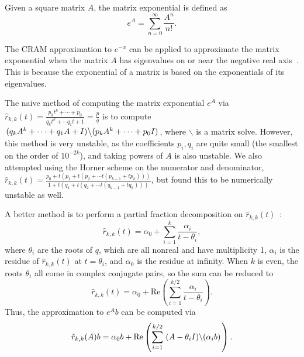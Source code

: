 Given a square matrix $A$, the matrix exponential is defined
as~\cite{ationneeded}
\begin{equation}
  \label{eq:matrix-exponential}
  e^{A} = \sum_{n=0}^\infty \frac{A^n}{n!}.
\end{equation}

The CRAM approximation to $e^{-x}$ can be applied to approximate the matrix
exponential when the matrix $A$ has eigenvalues on or near the negative real
axis~\cite{pusa2010computing}. This is because the exponential of a matrix is
based on the exponentials of its eigenvalues.


The naive method of computing the matrix exponential $e^A$ via
$\hat{r}_{k, k}(t)=\frac{p_kt^k + \cdots + p_0}{q_kt^k + \cdots q_1t +
  1}=\frac{p}{q}$ is to compute
$\left .(q_kA^k + \cdots + q_1A + I)\middle\backslash(p_kA^k + \cdots + p_0 I)\right.$, where
$\backslash$ is a matrix solve. However, this method is very unstable, as the
coefficients $p_i,q_i$ are quite small (the smallest on the order of
$10^{-2k}$), and taking powers of $A$ is also unstable. We also attempted
using the Horner scheme on the numerator and denominator,
$\hat{r}_{k, k}(t)=\frac{p_0 + t(p_1 + t(p_2 + \cdots t(p_{k-1} + tp_k)))}{1 +
  t(q_1 + t(q_2 + \cdots t(q_{k-1} + tq_k)))}$, but found this to be
numerically unstable as well.

A better method is to perform a partial fraction decomposition on $\hat{r}_{k,
  k}(t)$~\cite{pusa2010computing}:
\begin{equation}
\label{eq:part-frac}
  \hat{r}_{k, k}(t) = \alpha_0 + \sum_{i=1}^k \frac{\alpha_i}{t - \theta_i},
\end{equation}
where $\theta_i$ are the roots of $q$, which are all
nonreal and have multiplicity 1, $\alpha_i$ is the residue of
$\hat{r}_{k, k}(t)$ at $t=\theta_i$, and $\alpha_0$ is the residue at
infinity. When $k$ is even, the roots $\theta_i$ all come in complex conjugate
pairs, so the sum can be reduced to
\begin{equation}
  \hat{r}_{k, k}(t) = \alpha_0 + \mathrm{Re}\left(\sum_{i=1}^{k/2}
    \frac{\alpha_i}{t - \theta_i}\right).
\end{equation}
Thus, the approximation to $e^Ab$ can be computed via
\begin{equation}
\label{eq:part-frac-matrix-re}
  \hat{r}_{k, k}(A)b = \alpha_0b + \mathrm{Re}\left(\sum_{i=1}^{k/2} \left. (A -
    \theta_i I)\middle\backslash(\alpha_i b) \right.\right).
\end{equation}

